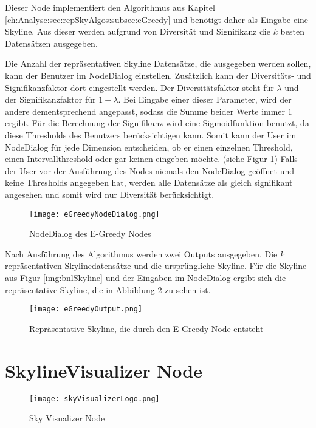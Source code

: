 Dieser Node implementiert den Algorithmus aus Kapitel \ref{ch:Analyse:sec:repSkyAlgos:subsec:eGreedy} und benötigt daher als Eingabe eine Skyline. Aus dieser werden aufgrund von Diversität und Signifikanz die $k$ besten Datensätzen ausgegeben.

Die Anzahl der repräsentativen Skyline Datensätze, die ausgegeben werden sollen, kann der Benutzer im NodeDialog einstellen. Zusätzlich kann der Diversitäts- und Signifikanzfaktor dort eingestellt werden. Der Diversitätsfaktor steht für $\lambda$ und der Signifikanzfaktor für $1-\lambda$. Bei Eingabe einer dieser Parameter, wird der andere dementsprechend angepasst, sodass die Summe beider Werte immer $1$ ergibt.
Für die Berechnung der Signifikanz wird eine Sigmoidfunktion benutzt, da diese Thresholds des Benutzers berücksichtigen kann. Somit kann der User im NodeDialog für jede Dimension entscheiden, ob er einen einzelnen Threshold, einen Intervallthreshold oder gar keinen eingeben möchte. (siehe Figur \ref{img:eGreedyNodeDialog}) Falls der User vor der Ausführung des Nodes niemals den NodeDialog geöffnet und keine Thresholds angegeben hat, werden alle Datensätze als gleich signifikant angesehen und somit wird nur Diversität berücksichtigt. 

\begin{figure}[H]
	\centering
	\texttt{[image: eGreedyNodeDialog.png]}
	\caption{NodeDialog des E-Greedy Nodes}
	\label{img:eGreedyNodeDialog}
\end{figure}

Nach Ausführung des Algorithmus werden zwei Outputs ausgegeben. Die $k$ repräsentativen Skylinedatensätze und die ursprüngliche Skyline. Für die Skyline aus Figur \ref{img:bnlSkyline} und der Eingaben im NodeDialog ergibt sich die repräsentative Skyline, die in Abbildung \ref{img:eGreedyOutput} zu sehen ist.

\begin{figure}[H]
	\centering
	\texttt{[image: eGreedyOutput.png]}
	\caption{Repräsentative Skyline, die durch den E-Greedy Node entsteht}
	\label{img:eGreedyOutput}
\end{figure}
\section{SkylineVisualizer Node}
\label{ch:Implementierung:sec:skyVisualizer}
\begin{figure}[H]
	\centering
	\texttt{[image: skyVisualizerLogo.png]}
	\caption{Sky Visualizer Node}
	\label{img:skyVisualizerLogo}
\end{figure}


